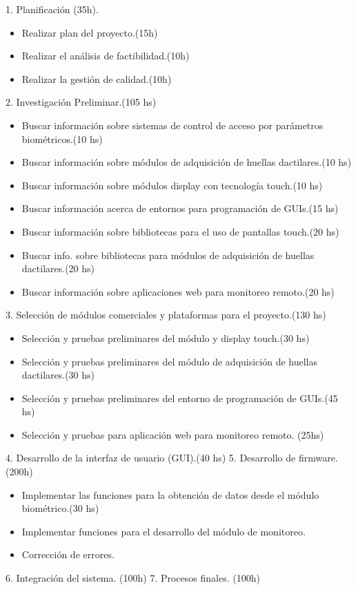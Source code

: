 1. Planificación (35h).
\begin{itemize}
\item Realizar plan del proyecto.(15h)
\item Realizar el análisis de factibilidad.(10h)
\item Realizar la gestión de calidad.(10h)
\end{itemize} 
2. Investigación Preliminar.(105 hs)
\begin{itemize}
\item Buscar información sobre sistemas de control de acceso por parámetros biométricos.(10 hs)
\item Buscar información sobre módulos de adquisición de huellas dactilares.(10 hs)
\item Buscar información sobre módulos display con tecnología touch.(10 hs)
\item Buscar información acerca de entornos para programación de GUIs.(15 hs)
\item Buscar información sobre bibliotecas para el uso de pantallas touch.(20 hs)
\item Buscar info. sobre bibliotecas para módulos de adquisición de huellas dactilares.(20 hs)
\item Buscar información sobre aplicaciones web para monitoreo remoto.(20 hs)
\end{itemize}

3. Selección de módulos comerciales y plataformas para el proyecto.(130 hs)
\begin{itemize}
\item Selección y pruebas preliminares del módulo y display touch.(30 hs)
\item Selección y pruebas preliminares del módulo de adquisición de huellas dactilares.(30 hs) 
\item Selección y pruebas preliminares del entorno de programación de GUIs.(45 hs)
\item Selección y pruebas para aplicación web para monitoreo remoto. (25hs)
\end{itemize}

4. Desarrollo de la interfaz de usuario (GUI).(40 hs)
5. Desarrollo de firmware.(200h)
\begin{itemize}
\item Implementar las funciones para la obtención de datos desde el módulo biométrico.(30 hs)
\item Implementar funciones para el desarrollo del módulo de monitoreo.
\item Corrección de errores.
\end{itemize}
6. Integración del sistema. (100h)
7. Procesos finales. (100h)

